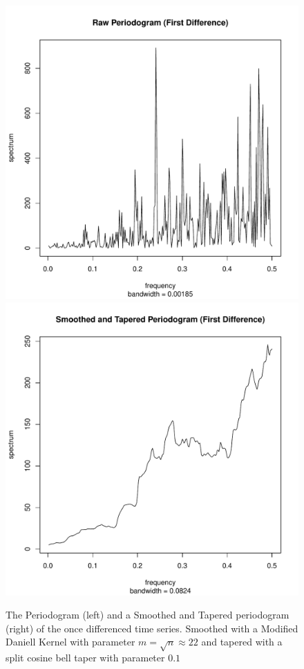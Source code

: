 \documentclass[11pt]{paper}
\begin{document}
\begin{figure}
\centering
\includegraphics[width=0.45\linewidth]{../image/raw_periodogram.pdf}
\includegraphics[width=0.45\linewidth]{../image/smooth_tapered_periodogram.pdf}
\caption{The Periodogram (left) and a Smoothed and Tapered periodogram (right) of the once differenced time series. Smoothed with a Modified Daniell Kernel with parameter $m = \sqrt{n} \approx 22$ and tapered with a split cosine bell taper with parameter $0.1$}
\label{periodogram}
\end{figure}
\end{document}
